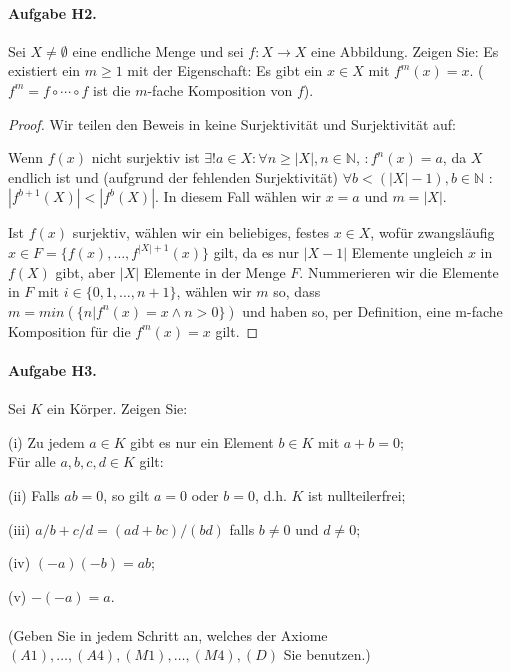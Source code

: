 \documentclass[12pt, letterpaper]{article}
\begin{document}
\paragraph{Aufgabe H2.}

Sei $X \neq \emptyset $ eine endliche Menge und sei $f : X \rightarrow X$ eine Abbildung.
Zeigen Sie: Es existiert ein $m \geq  1$ mit der Eigenschaft: Es gibt ein $x \in X$ mit
$f^m(x) = x$. ($f^m = f \circ \cdots \circ f$ ist die $m$-fache Komposition von $f$).

\begin{proof}
    Wir teilen den Beweis in keine Surjektivität und Surjektivität auf: \par
    Wenn $f(x)$ nicht surjektiv ist $\exists! a \in X : \forall  n \geq |X|, n \in \mathbb{N}$, $: f^n(x)=a $, 
    da $X$ endlich ist und (aufgrund der fehlenden Surjektivität) $\forall  b < (|X|-1), b \in \mathbb{N}$ : $|f^{b+1}(X)| < |f^b(X)|$.
    In diesem Fall wählen wir $x=a$  und $m=|X|$. \par
    Ist $f(x)$ surjektiv, wählen wir ein beliebiges, festes $x \in X$, wofür zwangsläufig $x \in F=\{f(x),\ldots,f^{|X|+1}(x)\}$ gilt, 
    da es nur $|X-1|$ Elemente ungleich $x$  in $f(X)$ gibt, aber $|X|$ Elemente in der Menge $F$.
    Nummerieren wir die Elemente in $F$ mit $i\in\{0,1,\ldots,n+1\}$, wählen wir $m$ so, dass $m = min(\{n | f^n(x)=x \land n>0 \})$
    und haben so, per Definition, eine m-fache Komposition für die $f^m(x)=x$ gilt.
\end{proof}

\paragraph{Aufgabe H3.}

Sei $K$ ein Körper. Zeigen Sie:
\par
    (i) Zu jedem $a \in K$ gibt es nur ein Element $b \in K$ mit $a + b = 0$;\\ Für alle $a, b, c, d \in K$ gilt:\par
(ii) Falls $ab = 0$, so gilt $a = 0$ oder $b = 0$, d.h. $K$ ist nullteilerfrei; \par
(iii) $a/b + c/d = (ad + bc)/(bd)$ falls $b \neq 0$ und $d \neq 0$; \par
(iv) $(-a)(-b) = ab$; \par
(v) $-(-a) = a$. \\ \\  
(Geben Sie in jedem Schritt an, welches der Axiome $(A1), \ldots , (A4), (M 1), \ldots , (M 4), (D)$
Sie benutzen.)
\end{document}
